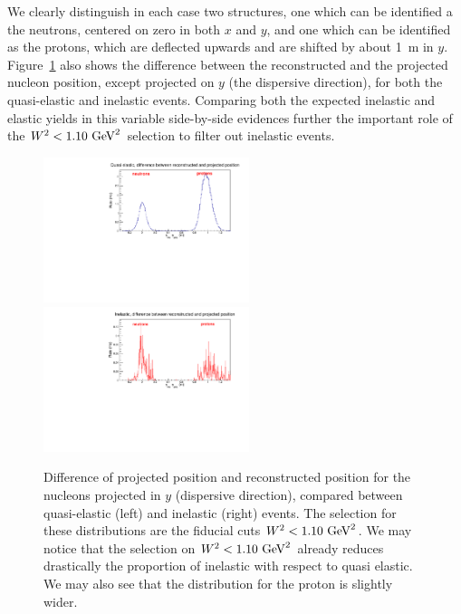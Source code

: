 %
We clearly distinguish in each case two structures, one which can be identified a the neutrons, centered on zero in both $x$ and $y$, and one which can be identified as the protons, which are deflected upwards and are shifted by about 1~m in $y$.
Figure~\ref{hcal_id_y} also shows the difference between the reconstructed and the projected nucleon position, except projected on $y$ (the dispersive direction), for both the quasi-elastic and inelastic events. Comparing both the expected inelastic and elastic yields in this variable side-by-side evidences further the important role of the $W^2<1.10~{\rm GeV}^2$ selection to filter out inelastic events. 
%

%
\begin{figure}[!h]
  \centering
    \includegraphics[width=6cm]{Answers_Readers/HCal_PID_QE_y.pdf}
    \includegraphics[width=6cm]{Answers_Readers/HCal_PID_Inel_y.pdf}
    \caption{Difference of projected position and reconstructed position for the nucleons projected in $y$ (dispersive direction), compared between quasi-elastic (left) and inelastic (right) events. The selection for these distributions are the fiducial cuts $W^2<1.10~{\rm GeV}^2$. We may notice that the selection on $W^2<1.10~{\rm GeV}^2$ already reduces drastically the proportion of inelastic with respect to quasi elastic. We may also see that the distribution for the proton is slightly wider. %
    }
    \label{hcal_id_y}
\end{figure}
%

